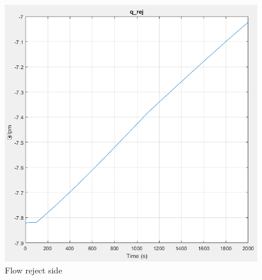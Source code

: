 \begin{figure}[h]
  \centering
  \includegraphics[width=0.5\linewidth]{q_rej.PNG}
  \caption{Flow reject side}
  \label{fig:qrej}
\end{figure}

